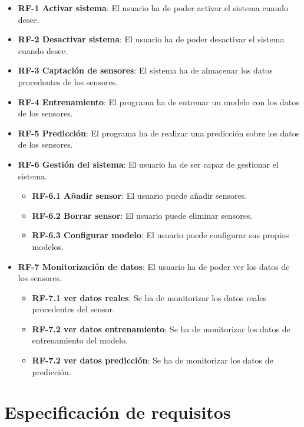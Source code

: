 \begin{itemize}

    \item \textbf{RF-1 Activar sistema}: El usuario ha de poder activar el sistema cuando desee.
    
    \item \textbf{RF-2 Desactivar sistema}: El usuario ha de poder desactivar el sistema cuando desee.
    
    \item \textbf{RF-3 Captación de sensores}: El sistema ha de almacenar los datos procedentes de los sensores.
    	
    \item \textbf{RF-4 Entrenamiento}: El programa ha de entrenar un modelo con los datos de los sensores.

    \item \textbf{RF-5 Predicción}: El programa ha de realizar una predicción sobre los datos de los sensores.

    \item \textbf{RF-6 Gestión del sistema}: El usuario ha de ser capaz de gestionar el sistema.
    \begin{itemize}
	    \item \textbf{RF-6.1 Añadir sensor}: El usuario puede añadir sensores.
	    \item \textbf{RF-6.2 Borrar sensor}: El usuario puede eliminar sensores.
	    \item \textbf{RF-6.3 Configurar modelo}: El usuario puede configurar sus propios modelos.
	\end{itemize}
	
	\item \textbf{RF-7 Monitorización de datos}: El usuario ha de poder ver los datos de los sensores.
	\begin{itemize}
	    \item \textbf{RF-7.1 ver datos reales}: Se ha de monitorizar los datos reales procedentes del sensor.
	    \item \textbf{RF-7.2 ver datos entrenamiento}: Se ha de monitorizar los datos de entrenamiento del modelo.
	    \item \textbf{RF-7.2 ver datos predicción}: Se ha de monitorizar los datos de predicción.
	\end{itemize}
	
\end{itemize}	
\newpage



\section{Especificación de requisitos}


